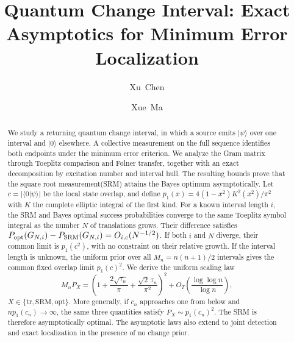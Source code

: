 \documentclass[a4paper,twocolumn,10pt,unpublished]{quantumarticle}
\numberwithin{equation}{section}
\theoremstyle{remark}
\begin{document}
\title{Quantum Change Interval: Exact Asymptotics for Minimum Error Localization}

\author{Xu~Chen}
\author{Xue~Ma}

\maketitle
{}

\begin{abstract}
We study a returning quantum change interval, in which a source emits
\(\lvert\psi\rangle\) over one interval and
\(\lvert0\rangle\) elsewhere. A collective measurement on the full sequence identifies both endpoints under the minimum error criterion. We analyze the Gram matrix through Toeplitz comparison and Følner
transfer, together with an exact decomposition by excitation number and
interval hull. The resulting bounds prove that the square root measurement(SRM) attains the Bayes optimum asymptotically. Let \(c=\lvert\langle0\vert\psi\rangle\rvert\) be the local state overlap, and define \(p_1(x)=4(1-x^2)K^2(x^2)/\pi^2\) with \(K\) the complete elliptic integral of the first kind. For a known interval length \(i\), the SRM and Bayes optimal success probabilities converge to the same Toeplitz symbol integral as the number \(N\) of translations grows. Their difference satisfies
\(
P_{\rm opt}(G_{N,i})-P_{\rm SRM}(G_{N,i})
=O_{i,c}(N^{-1/2}).
\)
If both \(i\) and \(N\) diverge, their common limit is \(p_1(c^2)\), with no
constraint on their relative growth. If the interval length is unknown, the uniform prior over all \(M_n=n(n+1)/2\) intervals gives the common fixed overlap limit \(p_1(c)^2\). We derive the uniform scaling law
\[
M_nP_X
=
\left(
1+\frac{2\sqrt{\tau_n}}{\pi}
+\frac{\sqrt{2}\,\tau_n}{\pi^2}
\right)^2
+
O_T\!\left(\frac{\log\log n}{\log n}\right),
\]
\(X\in\{\mathrm{tr},\mathrm{SRM},\mathrm{opt}\}\). More generally, if \(c_n\) approaches one from below and \(n p_1(c_n)\to\infty\), the same
three quantities satisfy \(P_X\sim p_1(c_n)^2\). The SRM is therefore
asymptotically optimal. The asymptotic laws also extend to joint detection and exact localization in the presence of no change prior.


\end{abstract}







\end{document}

